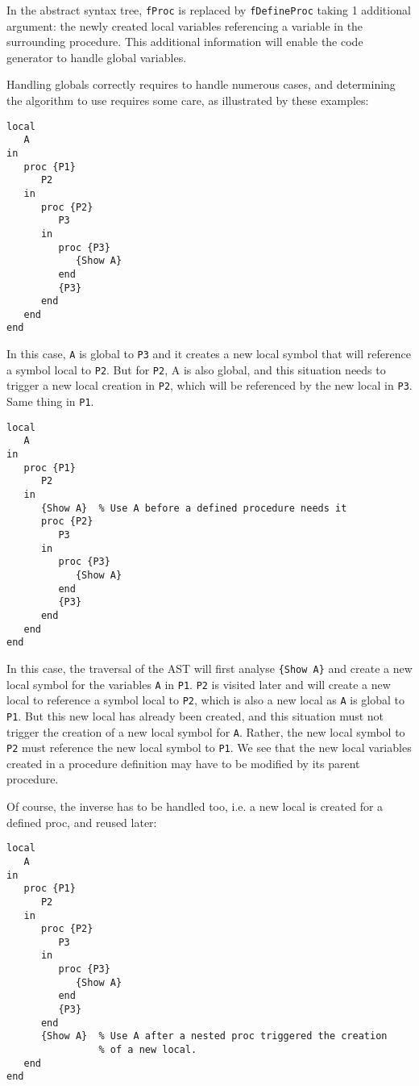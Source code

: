 \documentclass[a4paper]{memoir}
\begin{document}
In the abstract syntax tree, \lstinline!fProc! is replaced by
\lstinline!fDefineProc! taking 1 additional argument: the newly created local
variables referencing a variable in the surrounding procedure. This additional
information will enable the code generator to handle global variables.

Handling globals correctly requires to handle numerous cases, and determining the algorithm to use requires some care, as illustrated by these examples:

\begin{lstlisting}
local
   A
in
   proc {P1}
      P2
   in
      proc {P2}
         P3
      in
         proc {P3}
            {Show A}
         end
         {P3}
      end
   end
end
\end{lstlisting}
In this case, \lstinline!A! is global to \lstinline!P3! and it creates a new local symbol that will reference a symbol local to \lstinline!P2!. But for \lstinline!P2!, A is also global, and this situation needs to trigger a new local creation in \lstinline!P2!, which will be referenced by the new local in \lstinline!P3!. Same thing in \lstinline!P1!.

\begin{lstlisting}
local
   A
in
   proc {P1}
      P2
   in
      {Show A}  % Use A before a defined procedure needs it
      proc {P2}
         P3
      in
         proc {P3}
            {Show A}
         end
         {P3}
      end
   end
end
\end{lstlisting}

In this case, the traversal of the AST will first analyse \lstinline!{Show A}! and create a new local symbol for the variables \lstinline!A! in \lstinline!P1!. \lstinline!P2! is visited later and will create a new local to reference a symbol local to \lstinline!P2!, which is also a new local as \lstinline!A! is global to \lstinline!P1!. But this new local has already been created, and this situation must not trigger the creation of a new local symbol for \lstinline!A!. Rather, the new local symbol to \lstinline!P2! must reference the new local symbol to \lstinline!P1!. We see that the new local variables created in a procedure definition may have to be modified by its parent procedure.

Of course, the inverse has to be handled too, i.e. a new local is created for a defined proc, and reused later:

\begin{lstlisting}
local
   A
in
   proc {P1}
      P2
   in
      proc {P2}
         P3
      in
         proc {P3}
            {Show A}
         end
         {P3}
      end
      {Show A}  % Use A after a nested proc triggered the creation 
                % of a new local.
   end
end
\end{lstlisting}
\end{document}
